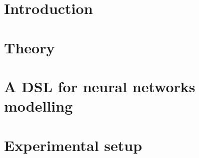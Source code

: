 \documentclass[a4paper,oneside]{memoir}
\begin{document}
\mainmatter

\chapter{Introduction} \label{sec:intro}
  

\chapter{Theory} \label{sec:theory}
  

\chapter{A DSL for neural networks modelling} \label{sec:dsl}
  

\chapter{Experimental setup} \label{sec:experiment}
  
\end{document}
